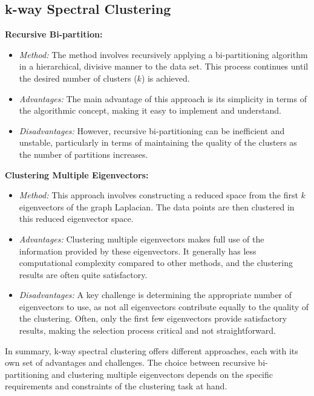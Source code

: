 \documentclass[unicode,11pt,a4paper,oneside,numbers=endperiod,openany]{scrartcl}
\begin{document}
\subsection{k-way Spectral Clustering}

\textbf{Recursive Bi-partition:}
\begin{itemize}
    \item \textit{Method:} The method involves recursively applying a bi-partitioning algorithm in a hierarchical, divisive manner to the data set. This process continues until the desired number of clusters (\( k \)) is achieved.

    \item \textit{Advantages:} The main advantage of this approach is its simplicity in terms of the algorithmic concept, making it easy to implement and understand.

    \item \textit{Disadvantages:} However, recursive bi-partitioning can be inefficient and unstable, particularly in terms of maintaining the quality of the clusters as the number of partitions increases.
\end{itemize}

\textbf{Clustering Multiple Eigenvectors:}
\begin{itemize}
    \item \textit{Method:} This approach involves constructing a reduced space from the first \( k \) eigenvectors of the graph Laplacian. The data points are then clustered in this reduced eigenvector space.

    \item \textit{Advantages:} Clustering multiple eigenvectors makes full use of the information provided by these eigenvectors. It generally has less computational complexity compared to other methods, and the clustering results are often quite satisfactory.

    \item \textit{Disadvantages:} A key challenge is determining the appropriate number of eigenvectors to use, as not all eigenvectors contribute equally to the quality of the clustering. Often, only the first few eigenvectors provide satisfactory results, making the selection process critical and not straightforward.
\end{itemize}

In summary, k-way spectral clustering offers different approaches, each with its own set of advantages and challenges. The choice between recursive bi-partitioning and clustering multiple eigenvectors depends on the specific requirements and constraints of the clustering task at hand.
\end{document}
